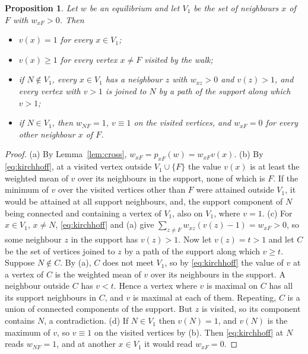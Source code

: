 \documentclass[11pt]{amsart}
\newtheorem{proposition}[theorem]{Proposition}
\theoremstyle{remark}
\begin{document}
\begin{proposition}\label{prop:volt}
Let $w$ be an equilibrium and let $V_1$ be the set of neighbours $x$ of $F$ with $w_{xF}>0$. Then
\begin{itemize}
\item[(a)] $v(x)=1$ for every $x\in V_1$;
\item[(b)] $v(x)\ge1$ for every vertex $x\ne F$ visited by the walk;
\item[(c)] if $N\notin V_1$, every $x\in V_1$ has a neighbour $z$ with $w_{xz}>0$ and $v(z)>1$, and every vertex
with $v>1$ is joined to $N$ by a path of the support along which $v>1$;
\item[(d)] if $N\in V_1$, then $w_{NF}=1$, $v\equiv1$ on the visited vertices, and $w_{xF}=0$ for every other
neighbour $x$ of $F$.
\end{itemize}
\end{proposition}
\begin{proof}
(a) By Lemma~\ref{lem:cross}, $w_{xF}=p_{xF}(w)=w_{xF}v(x)$.
(b) By \eqref{eq:kirchhoff}, at a visited vertex outside $V_1\cup\{F\}$ the value $v(x)$ is at least the weighted mean
of $v$ over its neighbours in the support, none of which is $F$. If the minimum of $v$ over the visited vertices other
than $F$ were attained outside $V_1$, it would be attained at all support neighbours, and, the support component of
$N$ being connected and containing a vertex of $V_1$, also on $V_1$, where $v=1$.
(c) For $x\in V_1$, $x\neq N$, \eqref{eq:kirchhoff} and (a) give $\sum_{z\ne F}w_{xz}(v(z)-1)=w_{xF}>0$, so some
neighbour $z$ in the support has $v(z)>1$. Now let $v(z)=t>1$ and let $C$ be the set of vertices joined to $z$ by a
path of the support along which $v\ge t$. Suppose $N\notin C$. By (a), $C$ does not meet $V_1$, so by
\eqref{eq:kirchhoff} the value of $v$ at a vertex of $C$ is the weighted mean of $v$ over its neighbours in the
support. A neighbour outside $C$ has $v<t$. Hence a vertex where $v$ is maximal on $C$ has all its support neighbours
in $C$, and $v$ is maximal at each of them. Repeating, $C$ is a union of connected components of the support. But $z$
is visited, so its component contains $N$, a contradiction.
(d) If $N\in V_1$ then $v(N)=1$, and $v(N)$ is the maximum of $v$, so $v\equiv1$ on the visited vertices by (b).
Then \eqref{eq:kirchhoff} at $N$ reads $w_{NF}=1$, and at another $x\in V_1$ it would read $w_{xF}=0$.
\end{proof}
\end{document}
